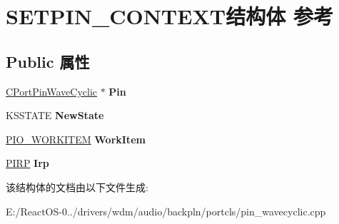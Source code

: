 \hypertarget{struct_s_e_t_p_i_n___c_o_n_t_e_x_t}{}\section{S\+E\+T\+P\+I\+N\+\_\+\+C\+O\+N\+T\+E\+X\+T结构体 参考}
\label{struct_s_e_t_p_i_n___c_o_n_t_e_x_t}
\subsection*{Public 属性}
\begin{DoxyCompactItemize}
\item 
\mbox{\label{struct_s_e_t_p_i_n___c_o_n_t_e_x_t_a7f7f448cf39e8504737d44b4cb1eec27}} 
\hyperlink{class_c_port_pin_wave_cyclic}{C\+Port\+Pin\+Wave\+Cyclic} $\ast$ {\bfseries Pin}
\item 
\mbox{\label{struct_s_e_t_p_i_n___c_o_n_t_e_x_t_a0f8acdb56c4d3dd42f83b0fe197f2d8a}} 
K\+S\+S\+T\+A\+TE {\bfseries New\+State}
\item 
\mbox{\label{struct_s_e_t_p_i_n___c_o_n_t_e_x_t_ade44dff7c0ef9827275ee9eee96b8759}} 
\hyperlink{struct___i_o___w_o_r_k_i_t_e_m}{P\+I\+O\+\_\+\+W\+O\+R\+K\+I\+T\+EM} {\bfseries Work\+Item}
\item 
\mbox{\label{struct_s_e_t_p_i_n___c_o_n_t_e_x_t_a780a457d99a5651b7ab9029281361006}} 
\hyperlink{interfacevoid}{P\+I\+RP} {\bfseries Irp}
\end{DoxyCompactItemize}


该结构体的文档由以下文件生成\+:\begin{DoxyCompactItemize}
\item 
E\+:/\+React\+O\+S-\/0../drivers/wdm/audio/backpln/portcls/pin\+\_\+wavecyclic.\+cpp\end{DoxyCompactItemize}
